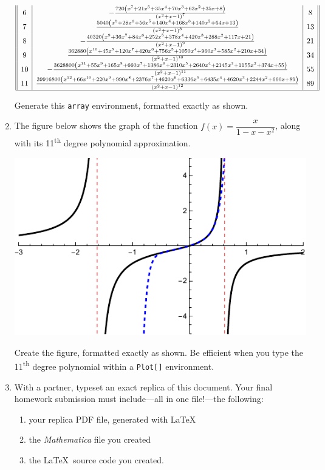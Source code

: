 \documentclass[12pt]{book}
\begin{document}
\begin{enumerate}
\begin{center}
$$\begin{array}{||c|c|c||}
			6 & -\frac{720 \left(x^7+21 x^5+35 x^4+70 x^3+63
				x^2+35 x+8\right)}{\left(x^2+x-1\right)^7} & 8
			\\
			7 & \frac{5040 \left(x^8+28 x^6+56 x^5+140 x^4+168
				x^3+140 x^2+64
				x+13\right)}{\left(x^2+x-1\right)^8} & 13 \\
			8 & -\frac{40320 \left(x^9+36 x^7+84 x^6+252
				x^5+378 x^4+420 x^3+288 x^2+117
				x+21\right)}{\left(x^2+x-1\right)^9} & 21 \\
			9 & \frac{362880 \left(x^{10}+45 x^8+120 x^7+420
				x^6+756 x^5+1050 x^4+960 x^3+585 x^2+210
				x+34\right)}{\left(x^2+x-1\right)^{10}} & 34 \\
			10 & -\frac{3628800 \left(x^{11}+55 x^9+165
				x^8+660 x^7+1386 x^6+2310 x^5+2640 x^4+2145
				x^3+1155 x^2+374
				x+55\right)}{\left(x^2+x-1\right)^{11}} & 55 \\
			11 & \frac{39916800 \left(x^{12}+66 x^{10}+220
				x^9+990 x^8+2376 x^7+4620 x^6+6336 x^5+6435
				x^4+4620 x^3+2244 x^2+660
				x+89\right)}{\left(x^2+x-1\right)^{12}} & 89 \\
			\hline
		\end{array}
		$$
	\end{center}
	Generate this \verb|array| environment, formatted exactly as shown.
	\newpage
	\item The figure below shows the graph of the function $f(x) = \dfrac{x}{1-x-x^2}$, along with its 11\textsuperscript{th} degree polynomial approximation.
	\begin{center}
		\includegraphics[width=6in]{graph.pdf}
	\end{center}
	Create the figure, formatted exactly as shown. Be efficient when you type the 11\textsuperscript{th} degree polynomial within a \verb|Plot[]| environment.
	\newpage 
	\item With a partner, typeset an exact replica of this document. Your final homework submission must include---all in one file!---the following: 
	\begin{enumerate}
		\item your replica PDF file, generated with \LaTeX
		\item the \textit{Mathematica} file you created 
		\item the \LaTeX \ source code you created.
	\end{enumerate}
\end{enumerate}
\end{document}
